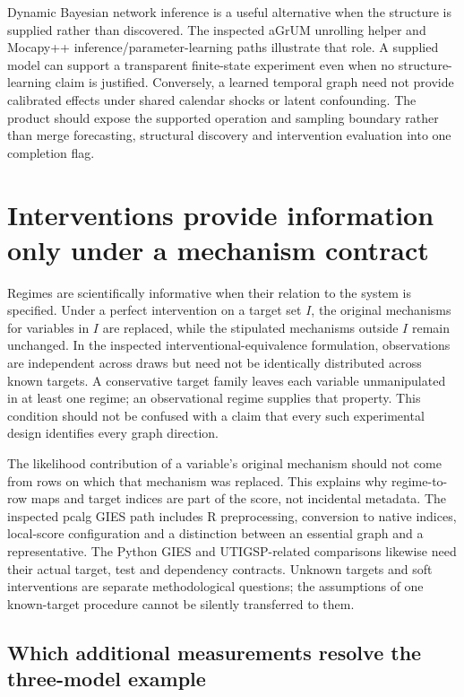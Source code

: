 Dynamic Bayesian network inference is a useful alternative when the structure
is supplied rather than discovered. The inspected aGrUM unrolling helper and
Mocapy++ inference/parameter-learning paths illustrate that role. A supplied
model can support a transparent finite-state experiment even when no
structure-learning claim is justified. Conversely, a learned temporal graph
need not provide calibrated effects under shared calendar shocks or latent
confounding. The product should expose the supported operation and sampling
boundary rather than merge forecasting, structural discovery and intervention
evaluation into one completion flag. \citep{exec16_ct_agrum,exec16_ct_mocapy,exec16_ct_sdbn}

\section{Interventions provide information only under a mechanism contract}

Regimes are scientifically informative when their relation to the system is
specified. Under a perfect intervention on a target set $I$, the original
mechanisms for variables in $I$ are replaced, while the stipulated mechanisms
outside $I$ remain unchanged. In the inspected interventional-equivalence
formulation, observations are independent across draws but need not be
identically distributed across known targets. A conservative target family
leaves each variable unmanipulated in at least one regime; an observational
regime supplies that property. This condition should not be confused with a
claim that every such experimental design identifies every graph direction.
\citep{exec14_pt_paper_gies}

The likelihood contribution of a variable's original mechanism should not
come from rows on which that mechanism was replaced. This explains why
regime-to-row maps and target indices are part of the score, not incidental
metadata. The inspected pcalg GIES path includes R preprocessing, conversion
to native indices, local-score configuration and a distinction between an
essential graph and a representative. The Python GIES and UTIGSP-related
comparisons likewise need their actual target, test and dependency contracts.
Unknown targets and soft interventions are separate methodological questions;
the assumptions of one known-target procedure cannot be silently transferred
to them. \citep{exec16_ct_pcalg,exec14_pt_gies,exec14_pt_causaldag}

\subsection{Which additional measurements resolve the three-model example}

